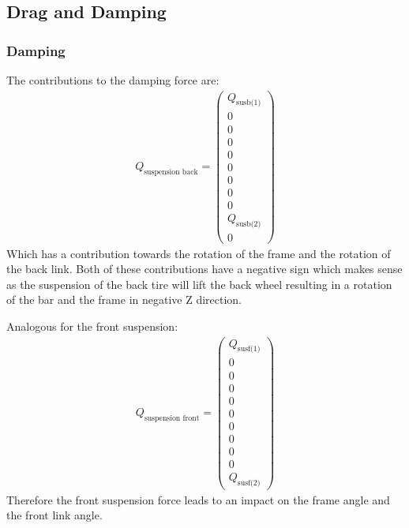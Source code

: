 \subsection{Drag and Damping}
\subsubsection{Damping}
The contributions to the damping force are:
\begin{equation}
    \begin{split}
        Q_{\text{suspension back}} = \begin{pmatrix}
            Q_{\text{susb(1)}}\\
            0\\
            0\\
            0\\
            0\\
            0\\
            0\\
            0\\
            0\\
            Q_{\text{susb(2)}}\\
            0
        \end{pmatrix}
    \end{split}
\end{equation}
Which has a contribution towards the rotation of the frame and the rotation of the back link. Both of these contributions have a negative sign which makes sense as the suspension of the back tire will lift the back wheel resulting in a rotation of the bar and the frame in negative Z direction.

Analogous for the front suspension:
\begin{equation}
    \begin{split}
        Q_{\text{suspension front}} = \begin{pmatrix}
            Q_{\text{susf(1)}}\\
            0\\
            0\\
            0\\
            0\\
            0\\
            0\\
            0\\
            0\\
            0\\
            Q_{\text{susf(2)}}
        \end{pmatrix}
    \end{split}
\end{equation}
Therefore the front suspension force leads to an impact on the frame angle and the front link angle.

